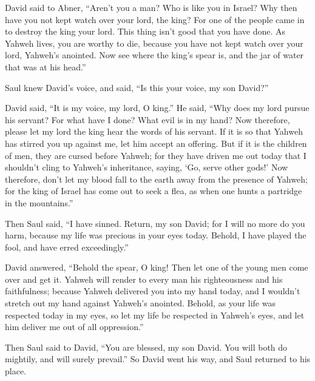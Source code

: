 {\par }{\PP {}David said to Abner, “Aren’t you a man? Who is like you in Israel? Why then have you not kept watch over your lord, the king? For one of the people came in to destroy the king your lord.
This thing isn’t good that you have done. As Yahweh lives, you are worthy to die, because you have not kept watch over your lord, Yahweh’s anointed. Now see where the king’s spear is, and the jar of water that was at his head.”
\par }{\PP {}Saul knew David’s voice, and said, “Is this your voice, my son David?”
\par }{\PP David said, “It is my voice, my lord, O king.”
He said, “Why does my lord pursue his servant? For what have I done? What evil is in my hand?
Now therefore, please let my lord the king hear the words of his servant. If it is so that Yahweh has stirred you up against me, let him accept an offering. But if it is the children of men, they are cursed before Yahweh; for they have driven me out today that I shouldn’t cling to Yahweh’s inheritance, saying, ‘Go, serve other gods!’
Now therefore, don’t let my blood fall to the earth away from the presence of Yahweh; for the king of Israel has come out to seek a flea, as when one hunts a partridge in the mountains.”
\par }{\PP {}Then Saul said, “I have sinned. Return, my son David; for I will no more do you harm, because my life was precious in your eyes today. Behold, I have played the fool, and have erred exceedingly.”
\par }{\PP {}David answered, “Behold the spear, O king! Then let one of the young men come over and get it.
Yahweh will render to every man his righteousness and his faithfulness; because Yahweh delivered you into my hand today, and I wouldn’t stretch out my hand against Yahweh’s anointed.
Behold, as your life was respected today in my eyes, so let my life be respected in Yahweh’s eyes, and let him deliver me out of all oppression.”
\par }{\PP {}Then Saul said to David, “You are blessed, my son David. You will both do mightily, and will surely prevail.” So David went his way, and Saul returned to his place.

}
